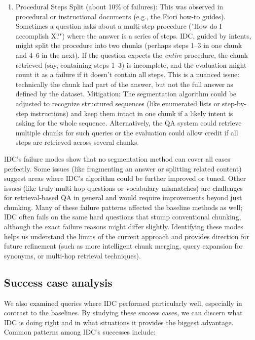\documentclass[12pt,a4paper]{report}
\begin{document}
\begin{enumerate}
\item Procedural Steps Split (about 10\% of failures): This was observed in procedural or instructional documents (e.g., the Fiori how-to guides). Sometimes a question asks about a multi-step procedure ("How do I accomplish X?") where the answer is a series of steps. IDC, guided by intents, might split the procedure into two chunks (perhaps steps 1--3 in one chunk and 4--6 in the next). If the question expects the \textit{entire} procedure, the chunk retrieved (say, containing steps 1--3) is incomplete, and the evaluation might count it as a failure if it doesn't contain all steps. This is a nuanced issue: technically the chunk had part of the answer, but not the full answer as defined by the dataset. Mitigation: The segmentation algorithm could be adjusted to recognize structured sequences (like enumerated lists or step-by-step instructions) and keep them intact in one chunk if a likely intent is asking for the whole sequence. Alternatively, the QA system could retrieve multiple chunks for such queries or the evaluation could allow credit if all steps are retrieved across several chunks.
\end{enumerate}

IDC's failure modes show that no segmentation method can cover all cases perfectly. Some issues (like fragmenting an answer or splitting related content) suggest areas where IDC's algorithm could be further improved or tuned. Other issues (like truly multi-hop questions or vocabulary mismatches) are challenges for retrieval-based QA in general and would require improvements beyond just chunking. Many of these failure patterns affected the baseline methods as well; IDC often fails on the same hard questions that stump conventional chunking, although the exact failure reasons might differ slightly. Identifying these modes helps us understand the limits of the current approach and provides direction for future refinement (such as more intelligent chunk merging, query expansion for synonyms, or multi-hop retrieval techniques).

\subsection{Success case analysis}\label{sec:success-cases}

We also examined queries where IDC performed particularly well, especially in contrast to the baselines. By studying these success cases, we can discern what IDC is doing right and in what situations it provides the biggest advantage. Common patterns among IDC's successes include:
\end{document}
